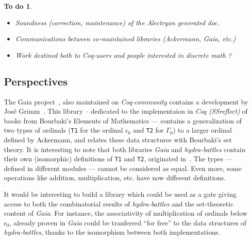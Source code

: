 \documentclass{easychair}
\newtheorem{todo}{To do}
\begin{document}
\begin{todo}
  \begin{itemize}
  \item  Soundness (correction, maintenance) of the Alectryon generated doc.
  \item Communications between co-maintained libraries
          (Ackermann, Gaia, etc.)
  \item Work destined both to Coq-users and people interested in discrete math ?
  \end{itemize}
\end{todo}


\subsection{Perspectives}


The Gaia project~\cite{Gaia}, also maintained on \textit{Coq-community} contains a development by José Grimm~\cite{grimm:hal-00911710}. This library -- dedicated  to the implementaion in \textit{Coq (SSreflect)} of books from  Bourbaki's Elements of Mathematics --- contains a generalization of two types of ordinals (\texttt{T1} for the ordinal $\epsilon_0$ and
\texttt{T2} for $\Gamma_0$) to a larger ordinal defined by Ackermann, and relates these data structures with Bourbaki's set theory.
It is interesting to note that both libraries \textit{Gaia} and \textit{hydra-battles} contain their own (isomorphic) definitions of
\texttt{T1} and \texttt{T2}, originated in~\cite{CantorContrib}.
The types --- defined in different modules --- cannot be considered as equal. Even more, some operations like addition, multiplication, etc. have now different definitions.

It would be interesting to build a library which could be used as a gate giving access to both the combinatorial results of \textit{hydra-battles} and the set-theoretic content of \textit{Gaia}.
For instance, the associativity of multiplication of ordinals below $\epsilon_0$, already proven in \textit{Gaia} could be tranferred ``for free'' to the data structures of \textit{hydra-battles}, thanks to the isomorphism between both implementations.






\label{sect:bib}

%
%
%

\end{document}
